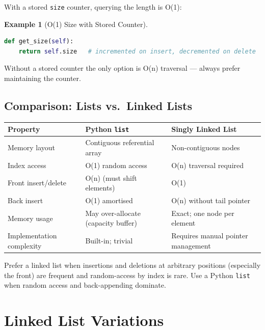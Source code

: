 \documentclass[11pt, a4paper, notitlepage]{report}
\theoremstyle{definition}
\theoremstyle{remark}
\theoremstyle{definition}
\newtheorem{example}[theorem]{Example}
\begin{document}
With a stored \texttt{size} counter, querying the length is O(1):

\begin{example}[O(1) Size with Stored Counter]
\leavevmode
\begin{lstlisting}[language=Python]
def get_size(self):
    return self.size   # incremented on insert, decremented on delete
\end{lstlisting}
Without a stored counter the only option is O(n) traversal --- always prefer
maintaining the counter.
\end{example}

\section{Comparison: Lists vs.\ Linked Lists}
\label{sec:ll-comparison}

\begin{center}
\begin{tabularx}{\linewidth}{lXX}
\toprule
\textbf{Property} & \textbf{Python \texttt{list}} & \textbf{Singly Linked List} \\
\midrule
Memory layout & Contiguous referential array & Non-contiguous nodes \\
Index access  & O(1) random access & O(n) traversal required \\
Front insert/delete & O(n) (must shift elements) & O(1) \\
Back insert   & O(1) amortised & O(n) without tail pointer \\
Memory usage  & May over-allocate (capacity buffer) & Exact; one node per element \\
Implementation complexity & Built-in; trivial & Requires manual pointer management \\
\bottomrule
\end{tabularx}
\end{center}

\begin{keyresult}[title={Key Result: When to Choose a Linked List}]
Prefer a linked list when insertions and deletions at arbitrary positions
(especially the front) are frequent and random-access by index is rare.
Use a Python \texttt{list} when random access and back-appending dominate.
\end{keyresult}

\chapter{Linked List Variations}
\label{ch:ll-variations}
\end{document}
